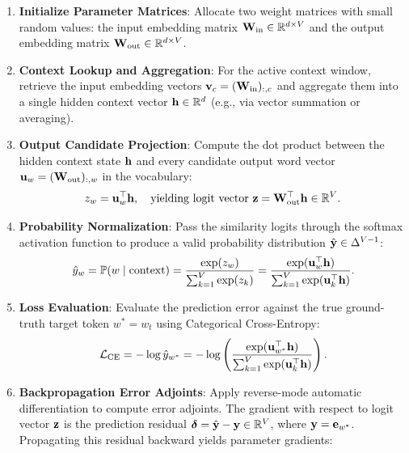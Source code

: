\documentclass[../../../main.tex]{subfiles}
\begin{document}
\begin{enumerate}
    \item \textbf{Initialize Parameter Matrices}: Allocate two weight matrices with small random values: the input embedding matrix $\mathbf{W}_{\text{in}} \in \mathbb{R}^{d \times V}$ and the output embedding matrix $\mathbf{W}_{\text{out}} \in \mathbb{R}^{d \times V}$.
    \item \textbf{Context Lookup and Aggregation}: For the active context window, retrieve the input embedding vectors $\mathbf{v}_c = (\mathbf{W}_{\text{in}})_{:, c}$ and aggregate them into a single hidden context vector $\mathbf{h} \in \mathbb{R}^d$ (e.g., via vector summation or averaging).
    \item \textbf{Output Candidate Projection}: Compute the dot product between the hidden context state $\mathbf{h}$ and every candidate output word vector $\mathbf{u}_w = (\mathbf{W}_{\text{out}})_{:, w}$ in the vocabulary:
    \begin{equation}
    \label{eq:logit_scoring}
    z_w = \mathbf{u}_w^\top \mathbf{h}, \quad \text{yielding logit vector } \mathbf{z} = \mathbf{W}_{\text{out}}^\top \mathbf{h} \in \mathbb{R}^V.
    \end{equation}
    \item \textbf{Probability Normalization}: Pass the similarity logits through the softmax activation function to produce a valid probability distribution $\hat{\mathbf{y}} \in \Delta^{V-1}$:
    \begin{equation}
    \label{eq:softmax_pred}
    \hat{y}_w = \mathbb{P}(w \mid \text{context}) = \frac{\exp(z_w)}{\sum_{k=1}^V \exp(z_k)} = \frac{\exp(\mathbf{u}_w^\top \mathbf{h})}{\sum_{k=1}^V \exp(\mathbf{u}_k^\top \mathbf{h})}.
    \end{equation}
    \item \textbf{Loss Evaluation}: Evaluate the prediction error against the true ground-truth target token $w^* = w_t$ using Categorical Cross-Entropy:
    \begin{equation}
    \label{eq:ce_loss}
    \mathcal{L}_{\text{CE}} = -\log \hat{y}_{w^*} = -\log \left( \frac{\exp(\mathbf{u}_{w^*}^\top \mathbf{h})}{\sum_{k=1}^V \exp(\mathbf{u}_k^\top \mathbf{h})} \right).
    \end{equation}
    \item \textbf{Backpropagation Error Adjoints}: Apply reverse-mode automatic differentiation to compute error adjoints. The gradient with respect to logit vector $\mathbf{z}$ is the prediction residual $\boldsymbol{\delta} = \hat{\mathbf{y}} - \mathbf{y} \in \mathbb{R}^V$, where $\mathbf{y} = \mathbf{e}_{w^*}$. Propagating this residual backward yields parameter gradients:
    \begin{equation}
    \label{eq:param_gradients}

\end{equation}
\end{enumerate}
\end{document}
